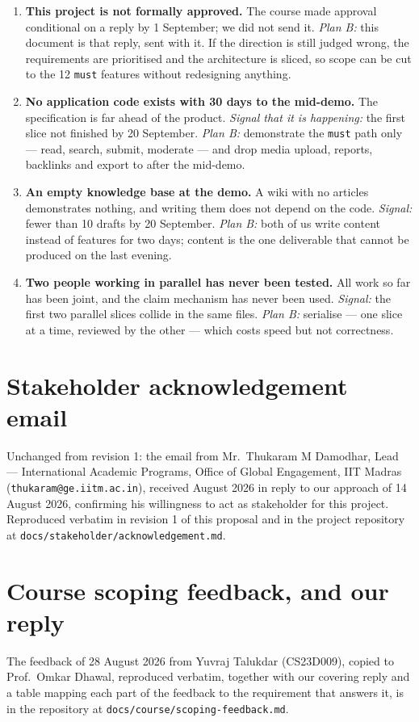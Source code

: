 \documentclass[11pt]{article}
\begin{document}
\begin{enumerate}
  \item \textbf{This project is not formally approved.} The course made approval conditional on a
        reply by 1 September; we did not send it. \emph{Plan B:} this document is that reply, sent
        with it. If the direction is still judged wrong, the requirements are prioritised and the
        architecture is sliced, so scope can be cut to the 12 \texttt{must} features without
        redesigning anything.
  \item \textbf{No application code exists with 30 days to the mid-demo.} The specification is far
        ahead of the product. \emph{Signal that it is happening:} the first slice not finished by
        20 September. \emph{Plan B:} demonstrate the \texttt{must} path only --- read, search,
        submit, moderate --- and drop media upload, reports, backlinks and export to after the
        mid-demo.
  \item \textbf{An empty knowledge base at the demo.} A wiki with no articles demonstrates nothing,
        and writing them does not depend on the code. \emph{Signal:} fewer than 10 drafts by
        20 September. \emph{Plan B:} both of us write content instead of features for two days;
        content is the one deliverable that cannot be produced on the last evening.
  \item \textbf{Two people working in parallel has never been tested.} All work so far has been
        joint, and the claim mechanism has never been used. \emph{Signal:} the first two parallel
        slices collide in the same files. \emph{Plan B:} serialise --- one slice at a time, reviewed
        by the other --- which costs speed but not correctness.
\end{enumerate}

\appendix

\section{Stakeholder acknowledgement email}

Unchanged from revision 1: the email from Mr.\ Thukaram M Damodhar, Lead --- International Academic
Programs, Office of Global Engagement, IIT Madras (\texttt{thukaram@ge.iitm.ac.in}), received August
2026 in reply to our approach of 14 August 2026, confirming his willingness to act as stakeholder
for this project. Reproduced verbatim in revision 1 of this proposal and in the project repository
at \texttt{docs/stakeholder/acknowledgement.md}.

\section{Course scoping feedback, and our reply}

The feedback of 28 August 2026 from Yuvraj Talukdar (CS23D009), copied to Prof.\ Omkar Dhawal,
reproduced verbatim, together with our covering reply and a table mapping each part of the feedback
to the requirement that answers it, is in the repository at
\texttt{docs/course/scoping-feedback.md}.
\end{document}
